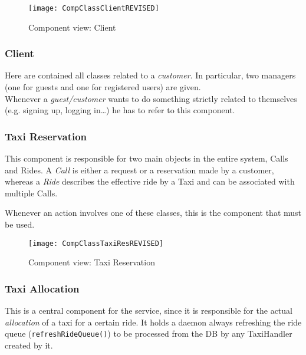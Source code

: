 \pagebreak

\begin{figure}
    \centering
    \texttt{[image: CompClassClientREVISED]}
    \caption{Component view: Client}
    \label{fig:compclassclient}
\end{figure}

\subsubsection{Client} %
Here are contained all classes related to a \emph{customer}. In particular, two managers (one for guests and one for registered users) are given. \\

Whenever a \emph{guest/customer} wants to do something strictly related to
themselves (e.g. signing up, logging in\ldots) he has to refer to this component.


        
\pagebreak
\subsubsection{Taxi Reservation} %
This component is responsible for two main objects in the entire system, Calls and Rides. 
A \emph{Call} is either a request or a reservation made by a customer, whereas a \emph{Ride} describes the effective ride by a Taxi and can be associated with multiple Calls.

Whenever an action involves one of these classes, this is the component that must be used.

\begin{figure}
    \centering
    \texttt{[image: CompClassTaxiResREVISED]}
    \caption{Component view: Taxi Reservation}
    \label{fig:compclasstaxires}
\end{figure}

        
\pagebreak
\subsubsection{Taxi Allocation} %
This is a central component for the service, since it is responsible for the actual \emph{allocation} of a taxi for a certain ride. It holds a daemon always refreshing the ride queue (\texttt{refreshRideQueue()}) to be processed from the DB by any TaxiHandler created by it.


